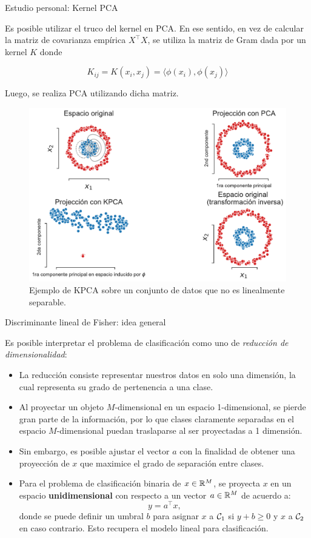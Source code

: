 \documentclass[9pt, handout]{beamer}
\begin{document}
\begin{frame}{Estudio personal: Kernel PCA}

Es posible utilizar el truco del kernel en PCA. En ese sentido, en vez de calcular la matriz de covarianza empírica $X^\top X$, se utiliza la matriz de Gram dada por un kernel $K$ donde

$$
K_{ij} = K(x_i,x_j) = \langle\phi(x_i),\phi(x_j)\rangle
$$

Luego, se realiza PCA utilizando dicha matriz.\\ \pause

\begin{figure}[ht]
    \centering
    \includegraphics[width=0.6\linewidth]{../../img/cap6_kpca.pdf}
    \caption{Ejemplo de KPCA sobre un conjunto de datos que no es linealmente separable.}
    \label{fig:kpca}
\end{figure}

\end{frame}

\begin{frame}{Discriminante lineal de Fisher: idea general}
	
Es posible interpretar el problema de clasificación como uno de \emph{reducción de dimensionalidad}: \pause

\begin{itemize}
	\item La reducción consiste representar nuestros datos  en solo una dimensión, la cual representa su grado de pertenencia a una clase. \pause
	\item Al proyectar un objeto $M$-dimensional en un espacio  1-dimensional, se pierde gran parte de la información, por lo que clases claramente separadas en el espacio $M$-dimensional puedan traslaparse al ser proyectadas a 1 dimensión.\pause
	\item Sin embargo, es posible ajustar el vector $a$ con la finalidad de obtener una proyección de $x$ que maximice el grado de separación entre clases.\pause
	\item Para el problema de clasificación binaria de $x\in \mathbb{R}^M$, se proyecta $x$ en un espacio \textbf{unidimensional} con respecto a un vector $a\in\mathbb{R}^M$ de acuerdo a:
\begin{equation*}
	y = a^\top x,
\end{equation*}
donde se puede definir un umbral $b$ para asignar $x$ a ${\mathcal C}_1$ si $y+b\geq 0$ y $x$ a ${\mathcal C}_2$ en caso contrario. Esto recupera el modelo lineal para clasificación.
\end{itemize}
	
\end{frame}
\end{document}
